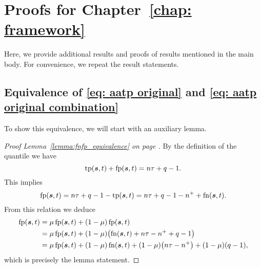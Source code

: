 \chapter{Proofs for Chapter~\ref{chap: framework}}

Here, we provide additional results and proofs of results mentioned in the main body. For convenience, we repeat the result statements.

\section{Equivalence of \eqref{eq: aatp original} and \eqref{eq: aatp original combination}}

To show this equivalence, we will start with an auxiliary lemma.

\lemmaequivalence*
\begin{proof}[Proof Lemma~\ref{lemma:fnfp_equivalence} on page \pageref{lemma:fnfp_equivalence}]
  By the definition of the quantile we have
  \begin{equation*}
    \operatorname{tp}(\bm{s},t)+\operatorname{fp}(\bm{s},t) = n\tau + q-1.
  \end{equation*}
  This implies
  \begin{equation*}
    \operatorname{fp}(\bm{s},t)=n\tau +q - 1-\operatorname{tp}(\bm{s},t) =n\tau+q-1-n^{+} +\operatorname{fn}(\bm{s},t).
  \end{equation*}
  From this relation we deduce
  \begin{equation*}
    \begin{aligned}
      \fp(\bm{s},t)
      & = \mu \fp(\bm{s},t) + (1 - \mu)\fp(\bm{s},t) \\
      & = \mu \fp(\bm{s},t) + (1 - \mu)\Brac{\fn(\bm{s},t) + n\tau - n^+ + q - 1} \\
      & = \mu \fp(\bm{s},t) + (1 - \mu)\fn(\bm{s},t) + (1-\mu)\Brac{n\tau - n^+} + (1-\mu)\Brac{q - 1},
    \end{aligned}
  \end{equation*}
  which is precisely the lemma statement.
\end{proof}

